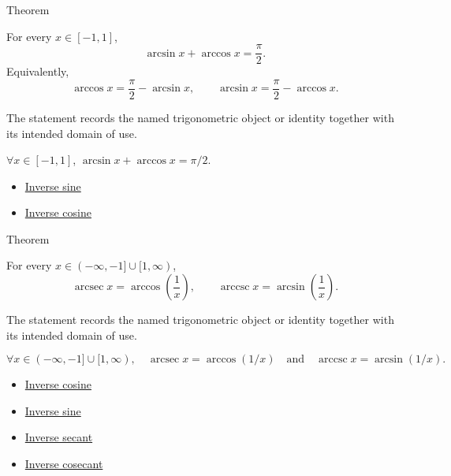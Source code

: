\begin{theorembox}{Theorem}
\begin{theorem}
\label{thm:inverse-trig-cofunction-identities}
For every $x\in[-1,1]$,
\[
  \arcsin x+\arccos x=\frac{\pi}{2}.
\]
Equivalently,
\[
  \arccos x=\frac{\pi}{2}-\arcsin x,
  \qquad
  \arcsin x=\frac{\pi}{2}-\arccos x.
\]
\end{theorem}
\end{theorembox}
\begin{remark*}[Interpretation]
The statement records the named trigonometric object or identity together with
its intended domain of use.
\end{remark*}

\begin{remark*}
$\forall x\in[-1,1]$, $\arcsin x+\arccos x=\pi/2$.
\end{remark*}
\begin{dependencies}
\begin{itemize}
  \item \hyperref[def:inverse-sine]{Inverse sine}
  \item \hyperref[def:inverse-cosine]{Inverse cosine}
\end{itemize}
\end{dependencies}

\begin{theorembox}{Theorem}
\begin{theorem}
\label{thm:inverse-trig-reciprocal-identities}
For every $x\in(-\infty,-1]\cup[1,\infty)$,
\[
  \operatorname{arcsec} x=\arccos\!\left(\frac{1}{x}\right),
  \qquad
  \operatorname{arccsc} x=\arcsin\!\left(\frac{1}{x}\right).
\]
\end{theorem}
\end{theorembox}
\begin{remark*}[Interpretation]
The statement records the named trigonometric object or identity together with
its intended domain of use.
\end{remark*}

\begin{remark*}
\[
  \forall x\in(-\infty,-1]\cup[1,\infty),\quad
  \operatorname{arcsec} x=\arccos(1/x)
  \quad\text{and}\quad
  \operatorname{arccsc} x=\arcsin(1/x).
\]
\end{remark*}
\begin{dependencies}
\begin{itemize}
  \item \hyperref[def:inverse-cosine]{Inverse cosine}
  \item \hyperref[def:inverse-sine]{Inverse sine}
  \item \hyperref[def:inverse-secant]{Inverse secant}
  \item \hyperref[def:inverse-cosecant]{Inverse cosecant}
\end{itemize}
\end{dependencies}

